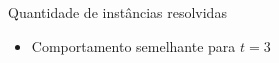 \documentclass[dvipsnames]{beamer}
\begin{document}
\begin{frame}{Quantidade de instâncias resolvidas}
  \begin{figure}[t]%
    \caption{}%
    \label{fig:tree_sf4_s40_50_unit}%
  \end{figure}

  \begin{itemize}
    \item Comportamento semelhante para $t = 3$
    \end{itemize}
\end{frame}
\end{document}
